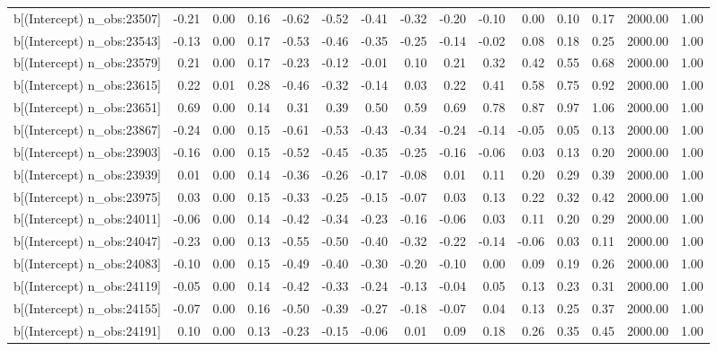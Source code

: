 \begin{table}[ht]
\begin{tabular}{rrrrrrrrrrrrrrr}
  b[(Intercept) n\_obs:23507] & -0.21 & 0.00 & 0.16 & -0.62 & -0.52 & -0.41 & -0.32 & -0.20 & -0.10 & 0.00 & 0.10 & 0.17 & 2000.00 & 1.00 \\ 
  b[(Intercept) n\_obs:23543] & -0.13 & 0.00 & 0.17 & -0.53 & -0.46 & -0.35 & -0.25 & -0.14 & -0.02 & 0.08 & 0.18 & 0.25 & 2000.00 & 1.00 \\ 
  b[(Intercept) n\_obs:23579] & 0.21 & 0.00 & 0.17 & -0.23 & -0.12 & -0.01 & 0.10 & 0.21 & 0.32 & 0.42 & 0.55 & 0.68 & 2000.00 & 1.00 \\ 
  b[(Intercept) n\_obs:23615] & 0.22 & 0.01 & 0.28 & -0.46 & -0.32 & -0.14 & 0.03 & 0.22 & 0.41 & 0.58 & 0.75 & 0.92 & 2000.00 & 1.00 \\ 
  b[(Intercept) n\_obs:23651] & 0.69 & 0.00 & 0.14 & 0.31 & 0.39 & 0.50 & 0.59 & 0.69 & 0.78 & 0.87 & 0.97 & 1.06 & 2000.00 & 1.00 \\ 
  b[(Intercept) n\_obs:23867] & -0.24 & 0.00 & 0.15 & -0.61 & -0.53 & -0.43 & -0.34 & -0.24 & -0.14 & -0.05 & 0.05 & 0.13 & 2000.00 & 1.00 \\ 
  b[(Intercept) n\_obs:23903] & -0.16 & 0.00 & 0.15 & -0.52 & -0.45 & -0.35 & -0.25 & -0.16 & -0.06 & 0.03 & 0.13 & 0.20 & 2000.00 & 1.00 \\ 
  b[(Intercept) n\_obs:23939] & 0.01 & 0.00 & 0.14 & -0.36 & -0.26 & -0.17 & -0.08 & 0.01 & 0.11 & 0.20 & 0.29 & 0.39 & 2000.00 & 1.00 \\ 
  b[(Intercept) n\_obs:23975] & 0.03 & 0.00 & 0.15 & -0.33 & -0.25 & -0.15 & -0.07 & 0.03 & 0.13 & 0.22 & 0.32 & 0.42 & 2000.00 & 1.00 \\ 
  b[(Intercept) n\_obs:24011] & -0.06 & 0.00 & 0.14 & -0.42 & -0.34 & -0.23 & -0.16 & -0.06 & 0.03 & 0.11 & 0.20 & 0.29 & 2000.00 & 1.00 \\ 
  b[(Intercept) n\_obs:24047] & -0.23 & 0.00 & 0.13 & -0.55 & -0.50 & -0.40 & -0.32 & -0.22 & -0.14 & -0.06 & 0.03 & 0.11 & 2000.00 & 1.00 \\ 
  b[(Intercept) n\_obs:24083] & -0.10 & 0.00 & 0.15 & -0.49 & -0.40 & -0.30 & -0.20 & -0.10 & 0.00 & 0.09 & 0.19 & 0.26 & 2000.00 & 1.00 \\ 
  b[(Intercept) n\_obs:24119] & -0.05 & 0.00 & 0.14 & -0.42 & -0.33 & -0.24 & -0.13 & -0.04 & 0.05 & 0.13 & 0.23 & 0.31 & 2000.00 & 1.00 \\ 
  b[(Intercept) n\_obs:24155] & -0.07 & 0.00 & 0.16 & -0.50 & -0.39 & -0.27 & -0.18 & -0.07 & 0.04 & 0.13 & 0.25 & 0.37 & 2000.00 & 1.00 \\ 
  b[(Intercept) n\_obs:24191] & 0.10 & 0.00 & 0.13 & -0.23 & -0.15 & -0.06 & 0.01 & 0.09 & 0.18 & 0.26 & 0.35 & 0.45 & 2000.00 & 1.00 \\ 

\end{tabular}
\end{table}
